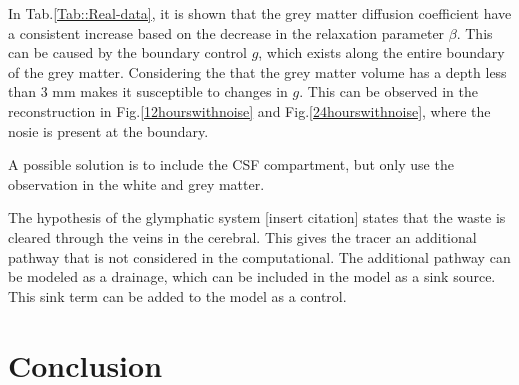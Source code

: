 \documentclass[11pt,a4paper]{article}
\begin{document}
In Tab.\ref{Tab::Real-data}, it is shown that the grey matter diffusion coefficient have a consistent increase based on the decrease in the relaxation parameter $\beta$. This can be caused by the boundary control $g$, which exists along the entire boundary of the grey matter. Considering the that the grey matter volume has a depth less than 3 mm makes it susceptible to changes in $g$. This can be observed in the reconstruction in Fig.\ref{12hourswithnoise} and Fig.\ref{24hourswithnoise}, where the nosie is present at the boundary. 
  
  

A possible solution is to include the CSF compartment, but only use the observation in the white and grey matter. 




The hypothesis of the glymphatic system [insert citation] states that the waste is cleared through the veins in the cerebral. This gives the tracer an additional pathway that is not considered in the computational. The additional pathway can be modeled as a drainage, which can be included in the model as a sink source. This sink term can be added to the model as a control. 




 
\section{Conclusion}



%
%
% 
% 
% 
%
% 
\end{document}
